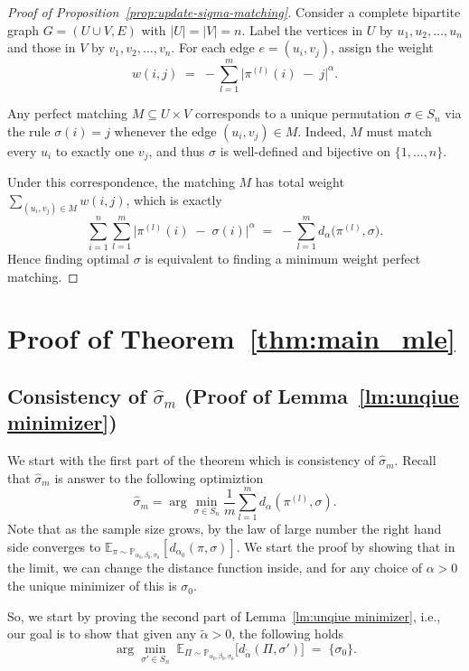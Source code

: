 \documentclass{article}
\renewcommand{\P}{\mathbb{P}}
\newcommand{\E}{ \mathbb{E}}
\begin{document}
\begin{proof}[Proof of Proposition~\ref{prop:update-sigma-matching}]
Consider a complete bipartite graph \(G=(U\cup V, E)\) with 
\(\lvert U\rvert=\lvert V\rvert=n\).  Label the vertices in \(U\) by \(u_1,u_2,\dots,u_n\)
and those in \(V\) by \(v_1,v_2,\dots,v_n\).  
For each edge \(e=(u_i,v_j)\), assign the weight
\[
w(i,j)
  \;=\;
  -\sum_{l=1}^m
    \bigl|\pi^{(l)}(i)\;-\;j\bigr|^\alpha.
\]

Any perfect matching \(M\subseteq U\times V\) corresponds to a unique permutation 
\(\sigma \in S_n\) via the rule \(\sigma(i)=j\) whenever the edge 
\((u_i,v_j)\in M\).  
Indeed, \(M\) must match every \(u_i\) to exactly one \(v_j\), and thus
\(\sigma\) is well-defined and bijective on \(\{1,\dots,n\}\).

Under this correspondence, the matching \(M\) has total weight
\(\sum_{(u_i,v_j)\in M} w(i,j)\), which is exactly
\[
\sum_{i=1}^n 
  \sum_{l=1}^m
    \bigl|\pi^{(l)}(i)\;-\;\sigma(i)\bigr|^\alpha
  \;=\;
  -\sum_{l=1}^m
    d_\alpha\bigl(\pi^{(l)},\sigma\bigr).
\]
Hence finding optimal $\sigma$
is equivalent to finding a minimum weight perfect matching. 
\end{proof}


\section{Proof of Theorem~\ref{thm:main_mle}}\label{sec: proof-mle}



\subsection{Consistency of $\hat\sigma_m$ (Proof of Lemma~\ref{lm:unqiue minimizer})}
We start with the first part of the theorem which is consistency of $\hat \sigma_m$.
Recall that $\hat\sigma_m$ is answer to the following optimiztion
\[
\hat{\sigma}_m = \arg\min_{\sigma \in S_n} \frac{1}{m}\sum_{l=1}^m d_\alpha(\pi^{(l)}, \sigma).
\]
Note that as the sample size grows, by the law of large number the right hand side converges to $\E_{\pi\sim \P_{\alpha_0,\beta_0,\sigma_0}}[d_{\alpha_0}(\pi, \sigma)].$  We start the proof by showing that in the limit, we can change the distance function inside, and for any choice of $\alpha> 0$ the unique minimizer of this is $\sigma_0$.  

So, we start by proving the second part of Lemma~\ref{lm:unqiue minimizer}, i.e., our goal is to show that given any $\tilde\alpha>0$, the following holds
\[
   \arg\min_{\sigma'\in S_n}\;\E_{\Pi\sim \P_{\alpha_0,\beta_0,\sigma_0}}\!\bigl[d_{\tilde\alpha}(\Pi,\sigma')\bigr]
   \;=\;\{\sigma_0\}.
\]
\end{document}
